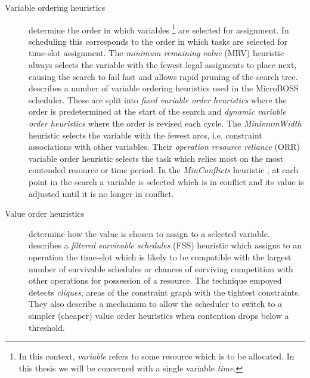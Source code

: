 \begin{description}
\item[Variable ordering heuristics]
determine the order in which variables \footnote{In this context, \emph{variable} refers to some resource which is to be allocated. In this thesis we will be concerned with a single variable \emph{time}.} are selected for assignment. In scheduling this corresponds to the order in which tasks are selected for time-slot assignment. The \emph{minimum remaining value} (MRV) heuristic \citep{bitner75backtrack} always selects the variable with the fewest legal assigments to place next, causing the search to fail fast and allows rapid pruning of the search tree. \citet{sadeh91lookahead} describes a number of variable ordering heuristics used in the MicroBOSS scheduler. These are split into \emph{fixed variable order heuristics} where the order is predetermined at the start of the search and \emph{dynamic variable order heuristics} where the order is revised each cycle. The \emph{MinimumWidth} heuristic selects the variable with the fewest arcs, i.e. constraint associations with other variables. Their \emph{operation resource reliance} (ORR) variable order heuristic selects the task which relies most on the most contended resource or time period. In the \emph{MinConflicts} heuristic \citep{minton92minconflicts}, at each point in the search a variable is selected which is in conflict and its value is adjusted until it is no longer in conflict. 


\item[Value order heuristics]
determine how the value is chosen to assign to a selected variable. \citet{sadeh91lookahead} describes a \emph{filtered survivable schedules} (FSS) heuristic which assigns to an operation the time-slot which is likely to be compatible with the largest number of survivable schedules or chances of surviving competition with other operations for possession of a resource. The technique empoyed detects \emph{cliques}, areas of the constraint graph with the tightest constraints. They also describe a mechanism to allow the scheduler to switch to a simpler (cheaper) value order heuristics when contention drops below a threshold.



\end{description}
